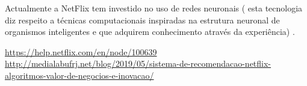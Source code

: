 \par Actualmente a NetFlix tem
investido no uso de redes neuronais ( esta tecnologia diz respeito a
técnicas computacionais inspiradas na estrutura neuronal de organismos inteligentes e que adquirem conhecimento através da experiência) \cite{net1}.



\begin{thebibliography}{8}

 \url{https://help.netflix.com/en/node/100639}
 \url{http://medialabufrj.net/blog/2019/05/sistema-de-recomendacao-netflix-algoritmos-valor-de-negocios-e-inovacao/}


\end{thebibliography}

